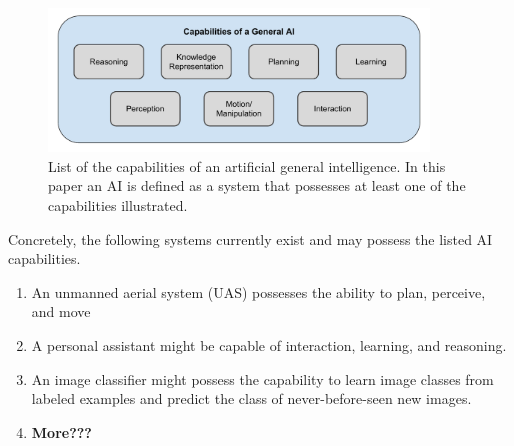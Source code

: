 	\begin{figure}[htbp]
    	\centering
     	\includegraphics[width=0.9\textwidth]{Figures/AI_capabilities}
    	\caption{List of the capabilities of an artificial general intelligence. In this paper an AI is defined as a system that possesses at least one of the capabilities illustrated.}
        \label{fig:AIcapabilities}
    \end{figure}

    Concretely, the following systems currently exist and may possess the listed AI capabilities.
    
    \begin{enumerate}
         \item An unmanned aerial system (UAS) possesses the ability to plan, perceive, and move
         \item A personal assistant might be capable of interaction, learning, and reasoning.
         \item An image classifier might possess the capability to learn image classes from labeled examples and predict the class of never-before-seen new images.
         \item \textbf{More???}
     \end{enumerate}


